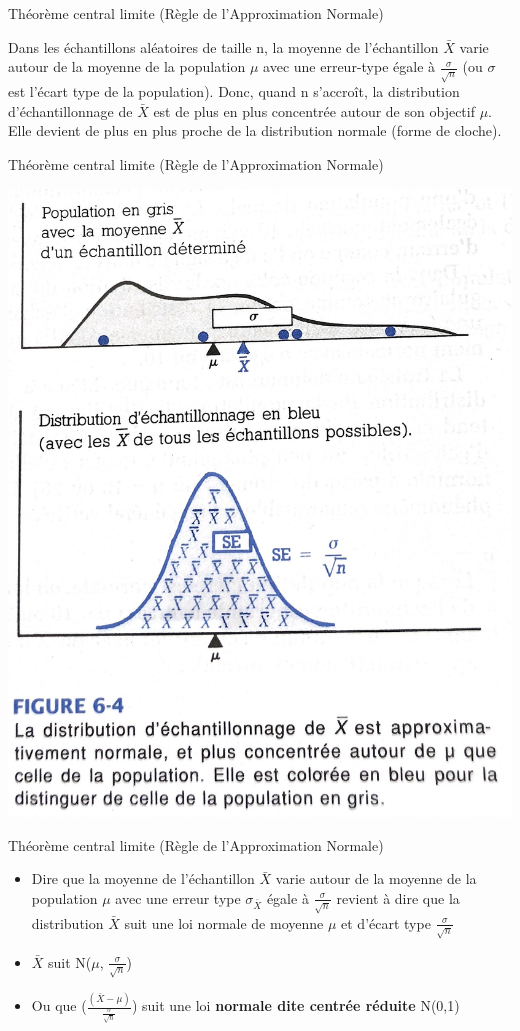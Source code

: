 \documentclass[ignorenonframetext,]{beamer}
\providecommand{\tightlist}{%
  \setlength{\itemsep}{0pt}\setlength{\parskip}{0pt}}
\begin{document}
\begin{frame}{Théorème central limite (Règle de l'Approximation
Normale)}

Dans les échantillons aléatoires de taille n, la moyenne de
l'échantillon \(\bar{X}\) varie autour de la moyenne de la population
\(\mu\) avec une erreur-type égale à \(\frac{\sigma}{\sqrt{n}}\) (ou
\(\sigma\) est l'écart type de la population). Donc, quand n s'accroît,
la distribution d'échantillonnage de \(\bar{X}\) est de plus en plus
concentrée autour de son objectif \(\mu\). Elle devient de plus en plus
proche de la distribution normale (forme de cloche).

\end{frame}

\begin{frame}{Théorème central limite (Règle de l'Approximation
Normale)}

\includegraphics[width=0.7\linewidth]{tcl}

\end{frame}

\begin{frame}{Théorème central limite (Règle de l'Approximation
Normale)}

\begin{itemize}
\tightlist
\item
  Dire que la moyenne de l'échantillon \(\bar{X}\) varie autour de la
  moyenne de la population \(\mu\) avec une erreur type
  \(\sigma_{\bar{X}}\) égale à \(\frac{\sigma}{\sqrt{n}}\) revient à
  dire que la distribution \(\bar{X}\) suit une loi normale de moyenne
  \(\mu\) et d'écart type \(\frac{\sigma}{\sqrt{n}}\)
\item
  \(\bar{X}\) suit N(\(\mu\), \(\frac{\sigma}{\sqrt{n}}\))
\item
  Ou que (\(\frac{(\bar{X}-\mu)}{\frac{\sigma}{\sqrt{n}}}\)) suit une
  loi \textbf{normale dite centrée réduite} N(0,1)
\end{itemize}

\end{frame}
\end{document}
